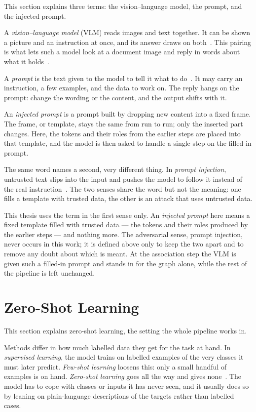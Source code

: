 This section explains three terms: the vision--language model, the prompt, and the
injected prompt.

A \emph{vision--language model} (VLM) reads images and text together. It can be
shown a picture and an instruction at once, and its answer draws on
both~\cite{radford2021clip, zhang2024vlmsurvey}. This pairing is what lets such a
model look at a document image and reply in words about what it
holds~\cite{kim2022donut}.

A \emph{prompt} is the text given to the model to tell it what to
do~\cite{liu2023prompt}. It may carry an instruction, a few examples, and the data
to work on. The reply hangs on the prompt: change the wording or the content, and
the output shifts with it.

An \emph{injected prompt} is a prompt built by dropping new content into a fixed
frame. The frame, or template, stays the same from run to run; only the inserted
part changes. Here, the tokens and their roles from the earlier steps are placed
into that template, and the model is then asked to handle a single step on the
filled-in prompt.

The same word names a second, very different thing. In \emph{prompt injection},
untrusted text slips into the input and pushes the model to follow it instead of
the real instruction~\cite{greshake2023promptinjection}. The two senses share the
word but not the meaning: one fills a template with trusted data, the other is an
attack that uses untrusted data.

This thesis uses the term in the first sense only. An \emph{injected prompt} here
means a fixed template filled with trusted data --- the tokens and their roles
produced by the earlier steps --- and nothing more. The adversarial sense, prompt
injection, never occurs in this work; it is defined above only to keep the two
apart and to remove any doubt about which is meant. At the association step the VLM
is given such a filled-in prompt and stands in for the graph alone, while the rest
of the pipeline is left unchanged.

\section{Zero-Shot Learning}\label{sec:bgd-zeroshot}

This section explains zero-shot learning, the setting the whole pipeline works in.

Methods differ in how much labelled data they get for the task at hand. In
\emph{supervised learning}, the model trains on labelled examples of the very
classes it must later predict. \emph{Few-shot learning} loosens this: only a small
handful of examples is on hand. \emph{Zero-shot learning} goes all the way and
gives none~\cite{xian2019zeroshot, wang2019zeroshotsurvey}. The model has to cope
with classes or inputs it has never seen, and it usually does so by leaning on
plain-language descriptions of the targets rather than labelled cases.

